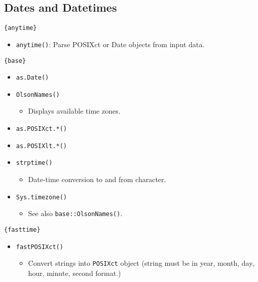 \documentclass[
]{book}
\providecommand{\tightlist}{%
  \setlength{\itemsep}{0pt}\setlength{\parskip}{0pt}}
\begin{document}
\hypertarget{dates-and-datetimes}{%
\subsection{Dates and Datetimes}\label{dates-and-datetimes}}

\texttt{\{anytime\}}

\begin{itemize}
\tightlist
\item
  \texttt{anytime()}: Parse POSIXct or Date objects from input data.
\end{itemize}

\texttt{\{base\}}

\begin{itemize}
\tightlist
\item
  \texttt{as.Date()}
\item
  \texttt{OlsonNames()}

  \begin{itemize}
  \tightlist
  \item
    Displays available time zones.
  \end{itemize}
\item
  \texttt{as.POSIXct.*()}
\item
  \texttt{as.POSIXlt.*()}
\item
  \texttt{strptime()}

  \begin{itemize}
  \tightlist
  \item
    Date-time conversion to and from character.
  \end{itemize}
\item
  \texttt{Sys.timezone()}

  \begin{itemize}
  \tightlist
  \item
    See also \texttt{base::OlsonNames()}.
  \end{itemize}
\end{itemize}

\texttt{\{fasttime\}}

\begin{itemize}
\tightlist
\item
  \texttt{fastPOSIXct()}

  \begin{itemize}
  \tightlist
  \item
    Convert strings into \texttt{POSIXct} object (string must be in year, month, day, hour, minute, second format.)
  \end{itemize}
\end{itemize}
\end{document}
